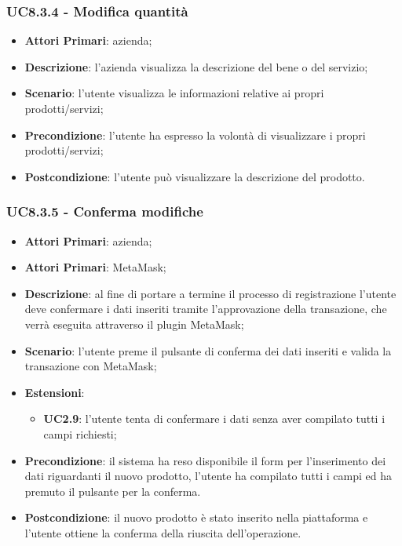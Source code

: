 \subsubsection{UC8.3.4 - Modifica quantità}
\begin{itemize}
	\item \textbf{Attori Primari}: azienda;
	\item \textbf{Descrizione}: l'azienda visualizza la descrizione del bene o del servizio;
	\item \textbf{Scenario}: l'utente visualizza le informazioni relative ai propri prodotti/servizi;
	\item \textbf{Precondizione}: l'utente ha espresso la volontà di visualizzare i propri prodotti/servizi;
	\item \textbf{Postcondizione}: l'utente può visualizzare la descrizione del prodotto.
\end{itemize}

\subsubsection{UC8.3.5 - Conferma modifiche}
\begin{itemize}
	\item \textbf{Attori Primari}: azienda;
	\item \textbf{Attori Primari}: MetaMask\glo;
	\item \textbf{Descrizione}: al fine di portare a termine il processo di registrazione l'utente deve confermare i dati inseriti tramite l'approvazione della transazione, che verrà eseguita attraverso il plugin MetaMask\glo;
	\item \textbf{Scenario}: l'utente preme il pulsante di conferma dei dati inseriti e valida la transazione con MetaMask\glo;
	\item \textbf{Estensioni}:
	\begin{itemize}
		\item \textbf{UC2.9}: l'utente tenta di confermare i dati senza aver compilato tutti i campi richiesti;
	\end{itemize}
	\item \textbf{Precondizione}: il sistema ha reso disponibile il form per l'inserimento dei dati riguardanti il nuovo prodotto, l'utente ha compilato tutti i campi ed ha premuto il pulsante per la conferma.
	\item \textbf{Postcondizione}: il nuovo prodotto è stato inserito nella piattaforma e l'utente ottiene la conferma della riuscita dell'operazione.
\end{itemize}

